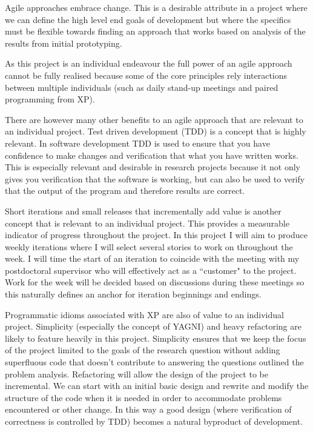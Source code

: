 Agile approaches embrace change. This is a desirable attribute in a project where we can define the high level end goals of development but where the specifics must be flexible towards finding an approach that works based on analysis of the results from initial prototyping.

As this project is an individual endeavour the full power of an agile approach cannot be fully realised because some of the core principles rely interactions between multiple individuals (such as daily stand-up meetings and paired programming from XP).

There are however many other benefits to an agile approach that are relevant to an individual project. Test driven development (TDD) is a concept that is highly relevant. In software development TDD is used to ensure that you have confidence to make changes and verification that what you have written works. This is especially relevant and desirable in research projects because it not only gives you verification that the software is working, but can also be used to verify that the output of the program and therefore results are correct.

Short iterations and small releases that incrementally add value is another concept that is relevant to an individual project. This provides a measurable indicator of progress throughout the project. In this project I will aim to produce weekly iterations where I will select several stories to work on throughout the week. I will time the start of an iteration to coincide with the meeting with my postdoctoral supervisor who will effectively act as a ``customer" to the project. Work for the week will be decided based on discussions during these meetings so this naturally defines an anchor for iteration beginnings and endings.

Programmatic idioms associated with XP are also of value to an individual project. Simplicity (especially the concept of YAGNI) and heavy refactoring are likely to feature heavily in this project. Simplicity ensures that we keep the focus of the project limited to the goals of the research question without adding superfluous code that doesn't contribute to answering the questions outlined the problem analysis. Refactoring will allow the design of the project to be incremental. We can start with an initial basic design and rewrite and modify the structure of the code when it is needed in order to accommodate problems encountered or other change. In this way a good design (where verification of correctness is controlled by TDD) becomes a natural byproduct of development.


